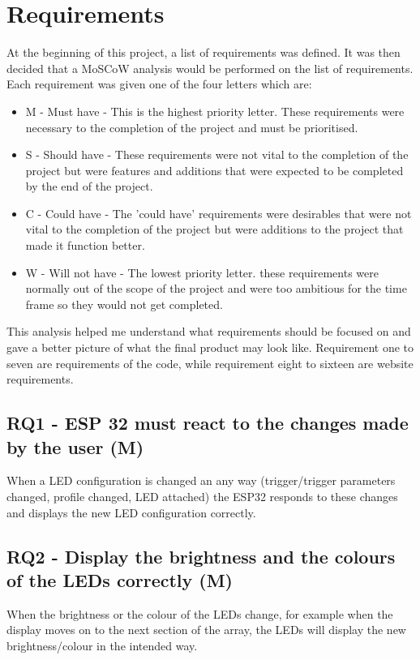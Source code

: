 \chapter {Requirements}
At the beginning of this project, a list of requirements was defined. It was then decided that a MoSCoW analysis would be performed on the list of requirements. Each requirement was given one of the four letters which are:
\begin{itemize}
\item M - Must have - This is the highest priority letter. These requirements were necessary to the completion of the project and must be prioritised.

\item S - Should have - These requirements were not vital to the completion of the project but were features and additions that were expected to be completed by the end of the project.

\item C - Could have - The 'could have' requirements were desirables that were not vital to the completion of the project but were additions to the project that made it function better. 

\item W - Will not have - The lowest priority letter. these requirements were normally out of the scope of the project and were too ambitious for the time frame so they would not get completed.
\end{itemize}
This analysis helped me understand what requirements should be focused on and gave a better picture of what the final product may look like. Requirement one to seven are requirements of the code, while requirement eight to sixteen are website requirements.

\section {RQ1 - ESP 32 must react to the changes made by the user (M)}
When a LED configuration is changed an any way (trigger/trigger parameters changed, profile changed, LED attached) the ESP32 responds to these changes and displays the new LED configuration correctly. 

\section {RQ2 - Display the brightness and the colours of the LEDs correctly (M)}
When the brightness or the colour of the LEDs change, for example when the display moves on to the next section of the array, the LEDs will display the new brightness/colour in the intended way.

